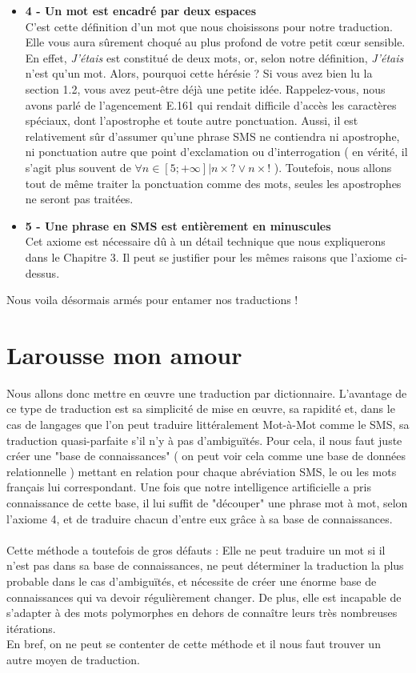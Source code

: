 \documentclass[11pt]{report}
\begin{document}
\begin{itemize}
		\item \textbf{4 - Un mot est encadré par deux espaces}\\
		C'est cette définition d'un mot que nous choisissons pour notre traduction. Elle vous aura sûrement choqué au plus profond de votre petit cœur sensible. En effet, {\em J'étais} est constitué de deux mots, or, selon notre définition, {\em J'étais} n'est qu'un mot. Alors, pourquoi cette hérésie ? Si vous avez bien lu la section 1.2, vous avez peut-être déjà une petite idée. Rappelez-vous, nous avons parlé de l'agencement E.161 qui rendait difficile d'accès les caractères spéciaux, dont l'apostrophe et toute autre ponctuation. Aussi, il est relativement sûr d'assumer qu'une phrase SMS ne contiendra ni apostrophe, ni ponctuation autre que point d'exclamation ou d'interrogation ( en vérité, il s'agit plus souvent de $ \forall n \in [5;+\infty] | n \times ? \vee n \times ! $ ). Toutefois, nous allons tout de même traiter la ponctuation comme des mots, seules les apostrophes ne seront pas traitées.\\
		\item \textbf{5 - Une phrase en SMS est entièrement en minuscules}\\
		Cet axiome est nécessaire dû à un détail technique que nous expliquerons dans le Chapitre 3. Il peut se justifier pour les mêmes raisons que l'axiome ci-dessus.\\
	\end{itemize}
	
	Nous voila désormais armés pour entamer nos traductions !
	
	\section{Larousse mon amour}
	Nous allons donc mettre en œuvre une traduction par dictionnaire. L'avantage de ce type de traduction est sa simplicité de mise en œuvre, sa rapidité et, dans le cas de langages que l'on peut traduire littéralement Mot-à-Mot comme le SMS, sa traduction quasi-parfaite s'il n'y à pas d'ambiguïtés. Pour cela, il nous faut juste créer une "base de connaissances" ( on peut voir cela comme une base de données relationnelle ) mettant en relation pour chaque abréviation SMS, le ou les mots français lui correspondant. Une fois que notre intelligence artificielle a pris connaissance de cette base, il lui suffit de "découper" une phrase mot à mot, selon l'axiome 4, et de traduire chacun d'entre eux grâce à sa base de connaissances.
	\paragraph{}
	Cette méthode a toutefois de gros défauts : Elle ne peut traduire un mot si il n'est pas dans sa base de connaissances, ne peut déterminer la traduction la plus probable dans le cas d'ambiguïtés, et nécessite de créer une énorme base de connaissances qui va devoir régulièrement changer. De plus, elle est incapable de s'adapter à des mots polymorphes en dehors de connaître leurs très nombreuses itérations.\\
	En bref, on ne peut se contenter de cette méthode et il nous faut trouver un autre moyen de traduction.
	
\end{document}

